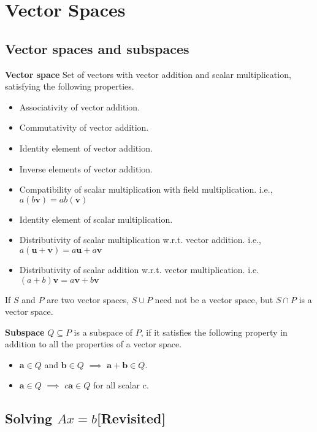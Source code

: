 \section{Vector Spaces}

\subsection{Vector spaces and subspaces}

\textbf{Vector space}
Set of vectors with vector addition and scalar multiplication, satisfying the following properties.\\
\begin{itemize}
	\item Associativity of vector addition.
	\item Commutativity of vector addition.
	\item Identity element of vector addition.
	\item Inverse elements of vector addition.
	\item Compatibility of scalar multiplication with field multiplication. i.e., $a(b\mathbf{v}) = ab(\mathbf{v})$
	\item Identity element of scalar multiplication.
	\item Distributivity of scalar multiplication w.r.t. vector addition. i.e., $a(\mathbf{u} + \mathbf{v}) = a\mathbf{u} + a\mathbf{v}$
	\item Distributivity of scalar addition w.r.t. vector multiplication. i.e. $(a + b)\mathbf{v} = a\mathbf{v} + b\mathbf{v}$
\end{itemize}

If $S$ and $P$ are two vector spaces, $S \cup P$ need not be a vector space, but $S \cap P$ is a vector space.


\textbf{Subspace}
$Q \subseteq P$ is a subspace of $P$, if it satisfies the following property in addition to all the properties of a vector space.
\begin{itemize}
	\item $\textbf{a} \in Q$ and $\textbf{b} \in Q$ $\implies$ $\textbf{a} + \textbf{b} \in Q$.	
	\item $\textbf{a} \in Q$ $\implies $ $c\textbf{a} \in Q$ for all scalar c.
\end{itemize}


\subsection{Solving $Ax = b$[Revisited]}

